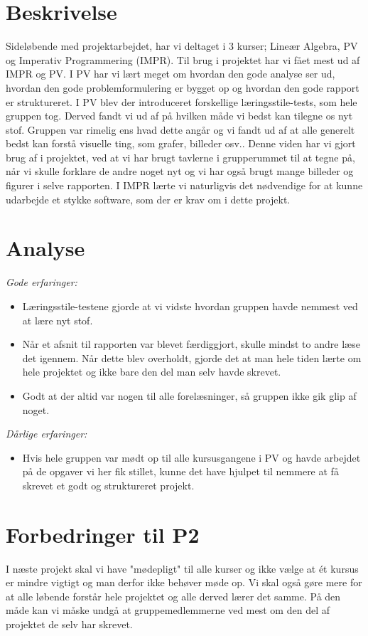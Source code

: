 \section{Beskrivelse}
Sideløbende med projektarbejdet, har vi deltaget i 3 kurser; Lineær Algebra, PV og Imperativ Programmering (IMPR). Til brug i projektet har vi fået mest ud af IMPR og PV. I PV har vi lært meget om hvordan den gode analyse ser ud, hvordan den gode problemformulering er bygget op og hvordan den gode rapport er struktureret.
I PV blev der introduceret forskellige læringsstile-tests, som hele gruppen tog. Derved fandt vi ud af på hvilken måde vi bedst kan tilegne os nyt stof. Gruppen var rimelig ens hvad dette angår og vi fandt ud af at alle generelt bedst kan forstå visuelle ting, som grafer, billeder osv.. Denne viden har vi gjort brug af i projektet, ved at vi har brugt tavlerne i grupperummet til at tegne på, når vi skulle forklare de andre noget nyt og vi har også brugt mange billeder og figurer i selve rapporten. 
I IMPR lærte vi naturligvis det nødvendige for at kunne udarbejde et stykke software, som der er krav om i dette projekt.

\section{Analyse}

\emph{Gode erfaringer:}
\begin{itemize}
\item	Læringsstile-testene gjorde at vi vidste hvordan gruppen havde nemmest ved at lære nyt stof. 

\item	 Når et afsnit til rapporten var blevet færdiggjort, skulle mindst to andre læse det igennem. Når dette blev overholdt, gjorde det at man hele tiden lærte om hele projektet og ikke bare den del man selv havde skrevet. 

\item	Godt at der altid var nogen til alle forelæsninger, så gruppen ikke gik glip af noget.
\end{itemize}\emph{Dårlige erfaringer:}
\begin{itemize}
\item	Hvis hele gruppen var mødt op til alle kursusgangene i PV og havde arbejdet på de opgaver vi her fik stillet, kunne det have hjulpet til nemmere at få skrevet et godt og struktureret projekt. 

\end{itemize}	 

\section{Forbedringer til P2}
I næste projekt skal vi have "mødepligt" til alle kurser og ikke vælge at ét kursus er mindre vigtigt og man derfor ikke behøver møde op. Vi skal også gøre mere for at alle løbende forstår hele projektet og alle derved lærer det samme. På den måde kan vi måske undgå at gruppemedlemmerne ved mest om den del af projektet de selv har skrevet. 
